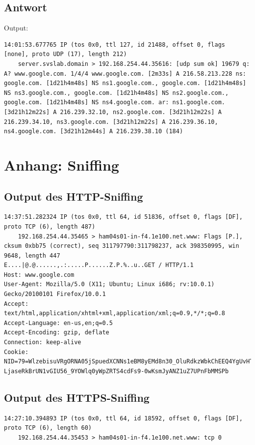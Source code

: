 \documentclass[twoside]{article}
\begin{document}
\subsection*{Antwort}
Output:
\begin{lstlisting}
14:01:53.677765 IP (tos 0x0, ttl 127, id 21488, offset 0, flags [none], proto UDP (17), length 212)
    server.svslab.domain > 192.168.254.44.35616: [udp sum ok] 19679 q: A? www.google.com. 1/4/4 www.google.com. [2m33s] A 216.58.213.228 ns: google.com. [1d21h4m48s] NS ns1.google.com., google.com. [1d21h4m48s] NS ns3.google.com., google.com. [1d21h4m48s] NS ns2.google.com., google.com. [1d21h4m48s] NS ns4.google.com. ar: ns1.google.com. [3d21h12m22s] A 216.239.32.10, ns2.google.com. [3d21h12m22s] A 216.239.34.10, ns3.google.com. [3d21h12m22s] A 216.239.36.10, ns4.google.com. [3d21h12m44s] A 216.239.38.10 (184) 
\end{lstlisting}

\section*{Anhang: Sniffing}
\label{sniffing}
\subsection*{Output des HTTP-Sniffing}
\label{http-sniffing}
\begin{lstlisting}
14:37:51.282324 IP (tos 0x0, ttl 64, id 51836, offset 0, flags [DF], proto TCP (6), length 487)
    192.168.254.44.35465 > ham04s01-in-f4.1e100.net.www: Flags [P.], cksum 0xbb75 (correct), seq 311797790:311798237, ack 398350995, win 9648, length 447
E....|@.@......,.:.....P......Z.P.%..u..GET / HTTP/1.1
Host: www.google.com
User-Agent: Mozilla/5.0 (X11; Ubuntu; Linux i686; rv:10.0.1) Gecko/20100101 Firefox/10.0.1
Accept: text/html,application/xhtml+xml,application/xml;q=0.9,*/*;q=0.8
Accept-Language: en-us,en;q=0.5
Accept-Encoding: gzip, deflate
Connection: keep-alive
Cookie: NID=79=WlzebisuVRgORNA05jSpuedXCNNs1eBM8yEMd8n30_OluRdkzWbkChEEQ4YgUvHTWB3a64hs LjaseRkBrUN1vGIU56_9YOWlq0yWpZRTS4cdFs9-0wKsmJyANZ1uZ7UPnFbMMSPb
\end{lstlisting}
\subsection*{Output des HTTPS-Sniffing}
\label{http-https}
\begin{lstlisting}
14:27:10.394893 IP (tos 0x0, ttl 64, id 18592, offset 0, flags [DF], proto TCP (6), length 60)
    192.168.254.44.35453 > ham04s01-in-f4.1e100.net.www: tcp 0 
\end{lstlisting}
\end{document}
